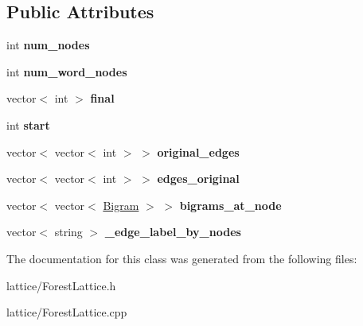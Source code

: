 \subsection*{Public Attributes}
\begin{DoxyCompactItemize}
\item 
\hypertarget{classForestLattice_a3c194341d2a88457604e0042534358fc}{
int {\bfseries num\_\-nodes}}
\label{classForestLattice_a3c194341d2a88457604e0042534358fc}

\item 
\hypertarget{classForestLattice_af7ac8b02750f52523a49b5b810e36601}{
int {\bfseries num\_\-word\_\-nodes}}
\label{classForestLattice_af7ac8b02750f52523a49b5b810e36601}

\item 
\hypertarget{classForestLattice_ab0e2ec92e11ab7d77e33c109f2451d7d}{
vector$<$ int $>$ {\bfseries final}}
\label{classForestLattice_ab0e2ec92e11ab7d77e33c109f2451d7d}

\item 
\hypertarget{classForestLattice_a95785401e57ddbcc516116f59391a7cd}{
int {\bfseries start}}
\label{classForestLattice_a95785401e57ddbcc516116f59391a7cd}

\item 
\hypertarget{classForestLattice_a2a0ccc16eaa3f83ae395c825c8bcf583}{
vector$<$ vector$<$ int $>$ $>$ {\bfseries original\_\-edges}}
\label{classForestLattice_a2a0ccc16eaa3f83ae395c825c8bcf583}

\item 
\hypertarget{classForestLattice_af55e45f3503fafeb79ef53d25abfc78b}{
vector$<$ vector$<$ int $>$ $>$ {\bfseries edges\_\-original}}
\label{classForestLattice_af55e45f3503fafeb79ef53d25abfc78b}

\item 
\hypertarget{classForestLattice_ac38a1f457fae9f29fab0b922dd8b5b81}{
vector$<$ vector$<$ \hyperlink{structBigram}{Bigram} $>$ $>$ {\bfseries bigrams\_\-at\_\-node}}
\label{classForestLattice_ac38a1f457fae9f29fab0b922dd8b5b81}

\item 
\hypertarget{classForestLattice_a80b60a05f3f81f4291b1989baf240cf8}{
vector$<$ string $>$ {\bfseries \_\-edge\_\-label\_\-by\_\-nodes}}
\label{classForestLattice_a80b60a05f3f81f4291b1989baf240cf8}

\end{DoxyCompactItemize}


The documentation for this class was generated from the following files:\begin{DoxyCompactItemize}
\item 
lattice/ForestLattice.h\item 
lattice/ForestLattice.cpp\end{DoxyCompactItemize}
